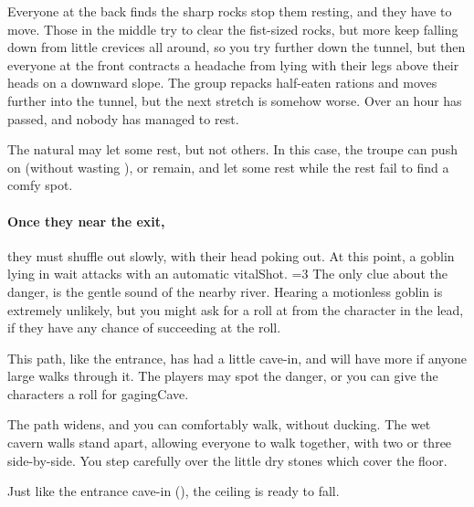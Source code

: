 \begin{multicols}{2}
\begin{boxtext}
  Everyone at the back finds the sharp rocks stop them resting, and they have to move.
  Those in the middle try to clear the fist-sized rocks, but more keep falling down from little crevices all around, so you try further down the tunnel, but then everyone at the front contracts a headache from lying with their legs above their heads on a downward slope.
  The group repacks half-eaten \glspl{ration} and moves further into the tunnel, but the next stretch is somehow worse.
  Over an hour has passed, and nobody has managed to rest.
\end{boxtext}

The \gls{natural} may let some rest, but not others.
In this case, the troupe can push on (without wasting ), or remain, and let some rest while the rest fail to find a comfy spot.

\paragraph{Once they near the exit,}
they must shuffle out slowly, with their head poking out.
At this point, a goblin lying in wait attacks with an automatic \gls{vitalShot}.
\ifnum\value{temperature}=3%
  The only clue about the danger, is the gentle sound of the nearby river.
\fi%
Hearing a motionless goblin is extremely unlikely, but you might ask for a  roll at \tn[16] from the character in the lead, if they have any chance of succeeding at the roll.


\playCommentaryDrowning[t]


This path, like the entrance, has had a little cave-in, and will have more if anyone large walks through it.
The players may spot the danger, or you can give the characters a roll for \gls{gagingCave}.

\begin{boxtext}
  The path widens, and you can comfortably walk, without ducking.
  The wet cavern walls stand apart, allowing everyone to walk together, with two or three side-by-side.
  You step carefully over the little dry stones which cover the floor.
\end{boxtext}

Just like the entrance cave-in (), the ceiling is ready to fall.


\end{multicols}
